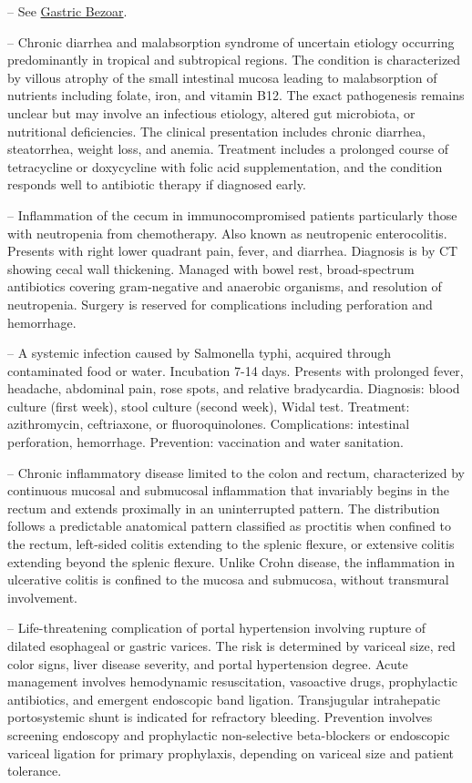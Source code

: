 -- See \hyperlink{Gastric Bezoar}{Gastric Bezoar}.

-- Chronic diarrhea and malabsorption syndrome of uncertain etiology occurring predominantly in tropical and subtropical regions. The condition is characterized by villous atrophy of the small intestinal mucosa leading to malabsorption of nutrients including folate, iron, and vitamin B12. The exact pathogenesis remains unclear but may involve an infectious etiology, altered gut microbiota, or nutritional deficiencies. The clinical presentation includes chronic diarrhea, steatorrhea, weight loss, and anemia. Treatment includes a prolonged course of tetracycline or doxycycline with folic acid supplementation, and the condition responds well to antibiotic therapy if diagnosed early.

-- Inflammation of the cecum in immunocompromised patients particularly those with neutropenia from chemotherapy. Also known as neutropenic enterocolitis. Presents with right lower quadrant pain, fever, and diarrhea. Diagnosis is by CT showing cecal wall thickening. Managed with bowel rest, broad-spectrum antibiotics covering gram-negative and anaerobic organisms, and resolution of neutropenia. Surgery is reserved for complications including perforation and hemorrhage.

-- A systemic infection caused by Salmonella typhi, acquired through contaminated food or water. Incubation 7-14 days. Presents with prolonged fever, headache, abdominal pain, rose spots, and relative bradycardia. Diagnosis: blood culture (first week), stool culture (second week), Widal test. Treatment: azithromycin, ceftriaxone, or fluoroquinolones. Complications: intestinal perforation, hemorrhage. Prevention: vaccination and water sanitation.

-- Chronic inflammatory disease limited to the colon and rectum, characterized by continuous mucosal and submucosal inflammation that invariably begins in the rectum and extends proximally in an uninterrupted pattern. The distribution follows a predictable anatomical pattern classified as proctitis when confined to the rectum, left-sided colitis extending to the splenic flexure, or extensive colitis extending beyond the splenic flexure. Unlike Crohn disease, the inflammation in ulcerative colitis is confined to the mucosa and submucosa, without transmural involvement.

-- Life-threatening complication of portal hypertension involving rupture of dilated esophageal or gastric varices. The risk is determined by variceal size, red color signs, liver disease severity, and portal hypertension degree. Acute management involves hemodynamic resuscitation, vasoactive drugs, prophylactic antibiotics, and emergent endoscopic band ligation. Transjugular intrahepatic portosystemic shunt is indicated for refractory bleeding. Prevention involves screening endoscopy and prophylactic non-selective beta-blockers or endoscopic variceal ligation for primary prophylaxis, depending on variceal size and patient tolerance.

